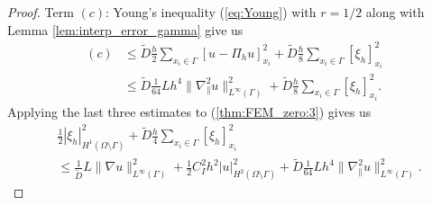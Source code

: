 \documentclass{article}
\theoremstyle{remark}
\def\gradt{\nabla_{\!\!{\scriptscriptstyle\parallel}}}
\def\tD{\widetilde{D}}
\begin{document}
\begin{proof}
Term $(c)$: Young's inequality (\ref{eq:Young}) with $r=1/2$ along with Lemma \ref{lem:interp_error_gamma} give us
\begin{equation}
\begin{split}
\label{thm:FEM_zero:5}
(c)&\leq \tD\frac{h}{2}\sum_{x_i\in\Gamma}[u-\Pi_h u]_{x_i}^2 +\tD\frac{h}{8}\sum_{x_i\in\Gamma}[\xi_h]_{x_i}^2\\ 
& \leq\tD\frac{1}{64}L h^4 \|\gradt^2 u\|_{L^\infty(\Gamma)}^2 +\tD\frac{h}{8}\sum_{x_i\in\Gamma}[\xi_h]_{x_i}^2.
\end{split}
\end{equation}
Applying the last three estimates to (\ref{thm:FEM_zero:3}) gives us
\begin{equation}
\label{thm:FEM_zero:6}
\begin{split}
&\frac{1}{2} |\xi_h|^2_{H^1(\Omega\setminus\Gamma)} +\tD\frac{h}{4}\sum_{x_i\in\Gamma}[\xi_h]_{x_i}^2\\
&\leq \frac{1}{\tD}L\|\nabla u\|^2_{L^\infty(\Gamma)}  +\frac{1}{2}C_I^2h^2|u|^2_{H^2(\Omega\setminus\Gamma)} +\tD\frac{1}{64}L h^4 \|\gradt^2 u\|_{L^\infty(\Gamma)}^2.
\end{split}
\end{equation}


\end{proof}
\end{document}

